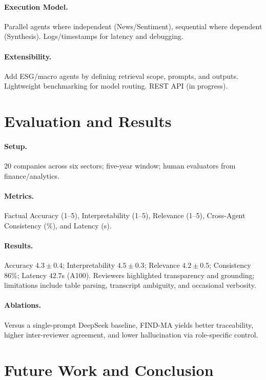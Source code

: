 \documentclass[11pt]{article}
\newcommand{\findma}{\textsc{FIND-MA}}
\begin{document}
\paragraph{Execution Model.}
Parallel agents where independent (News/Sentiment), sequential where dependent (Synthesis). Logs/timestamps for latency and debugging.

\paragraph{Extensibility.}
Add ESG/macro agents by defining retrieval scope, prompts, and outputs. Lightweight benchmarking for model routing. REST API (in progress).

\section{Evaluation and Results}
\label{sec:evaluation}
\paragraph{Setup.}
20 companies across six sectors; five-year window; human evaluators from finance/analytics.

\paragraph{Metrics.}
Factual Accuracy (1–5), Interpretability (1–5), Relevance (1–5), Cross-Agent Consistency (\%), and Latency (s).

\paragraph{Results.}
Accuracy $4.3\pm0.4$; Interpretability $4.5\pm0.3$; Relevance $4.2\pm0.5$; Consistency 86\%; Latency $42.7$s (A100). Reviewers highlighted transparency and grounding; limitations include table parsing, transcript ambiguity, and occasional verbosity.

\paragraph{Ablations.}
Versus a single-prompt DeepSeek baseline, \findma{} yields better traceability, higher inter-reviewer agreement, and lower hallucination via role-specific control.

\section{Future Work and Conclusion}
\label{sec:conclusion}
\end{document}
